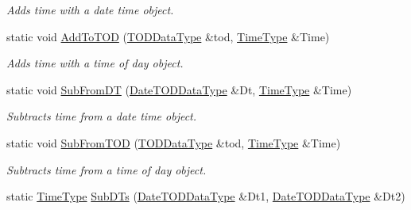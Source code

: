 \begin{DoxyCompactItemize}
\begin{DoxyCompactList}\small\item\em Adds time with a date time object. \end{DoxyCompactList}\item 
static void \hyperlink{classpc__emulator_1_1DataTypeUtils_a54cfe9dd10b69662ad68ff4f0844f619}{Add\+To\+T\+OD} (\hyperlink{structpc__emulator_1_1TODDataType}{T\+O\+D\+Data\+Type} \&tod, \hyperlink{structpc__emulator_1_1TIMEDataType}{Time\+Type} \&Time)\hypertarget{classpc__emulator_1_1DataTypeUtils_a54cfe9dd10b69662ad68ff4f0844f619}{}\label{classpc__emulator_1_1DataTypeUtils_a54cfe9dd10b69662ad68ff4f0844f619}

\begin{DoxyCompactList}\small\item\em Adds time with a time of day object. \end{DoxyCompactList}\item 
static void \hyperlink{classpc__emulator_1_1DataTypeUtils_a0086a7eba79bb1d0049d74e172103168}{Sub\+From\+DT} (\hyperlink{structpc__emulator_1_1DateTODDataType}{Date\+T\+O\+D\+Data\+Type} \&Dt, \hyperlink{structpc__emulator_1_1TIMEDataType}{Time\+Type} \&Time)\hypertarget{classpc__emulator_1_1DataTypeUtils_a0086a7eba79bb1d0049d74e172103168}{}\label{classpc__emulator_1_1DataTypeUtils_a0086a7eba79bb1d0049d74e172103168}

\begin{DoxyCompactList}\small\item\em Subtracts time from a date time object. \end{DoxyCompactList}\item 
static void \hyperlink{classpc__emulator_1_1DataTypeUtils_ae9646c27c41585a808f847c649043f24}{Sub\+From\+T\+OD} (\hyperlink{structpc__emulator_1_1TODDataType}{T\+O\+D\+Data\+Type} \&tod, \hyperlink{structpc__emulator_1_1TIMEDataType}{Time\+Type} \&Time)\hypertarget{classpc__emulator_1_1DataTypeUtils_ae9646c27c41585a808f847c649043f24}{}\label{classpc__emulator_1_1DataTypeUtils_ae9646c27c41585a808f847c649043f24}

\begin{DoxyCompactList}\small\item\em Subtracts time from a time of day object. \end{DoxyCompactList}\item 
static \hyperlink{structpc__emulator_1_1TIMEDataType}{Time\+Type} \hyperlink{classpc__emulator_1_1DataTypeUtils_a211df36821d3c8c3403481b4f164736d}{Sub\+D\+Ts} (\hyperlink{structpc__emulator_1_1DateTODDataType}{Date\+T\+O\+D\+Data\+Type} \&Dt1, \hyperlink{structpc__emulator_1_1DateTODDataType}{Date\+T\+O\+D\+Data\+Type} \&Dt2)\hypertarget{classpc__emulator_1_1DataTypeUtils_a211df36821d3c8c3403481b4f164736d}{}\label{classpc__emulator_1_1DataTypeUtils_a211df36821d3c8c3403481b4f164736d}


\end{DoxyCompactItemize}

